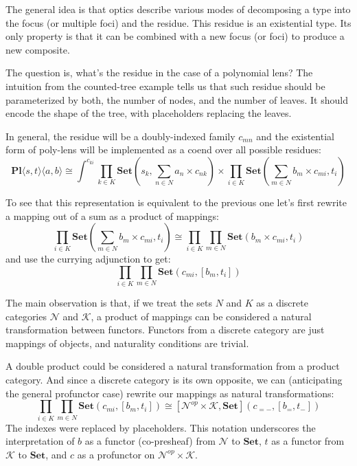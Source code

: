 \documentclass[11pt]{amsart}
\begin{document}
The general idea is that optics describe various modes of decomposing a type into the focus (or multiple foci) and the residue. This residue is an existential type. Its only property is that it can be combined with a new focus (or foci) to produce a new composite.

The question is, what's the residue in the case of a polynomial lens? The intuition from the counted-tree example tells us that such residue should be parameterized by both, the number of nodes, and the number of leaves. It should encode the shape of the tree, with placeholders replacing the leaves. 

In general, the residue will be a doubly-indexed family $c_{m n}$ and the existential form of poly-lens will be implemented as a coend over all possible residues:
\[ \mathbf{Pl}\langle s, t\rangle \langle a, b\rangle \cong \int^{c_{k i}} 
 \prod_{k \in K} \mathbf{Set} \left(s_k,  \sum_{n \in N} a_n \times c_{n k} \right) \times 
 \prod_{i \in K}  \mathbf{Set} \left(\sum_{m \in N} b_m \times c_{m i}, t_i \right) \]

To see that this representation is equivalent to the previous one let's first rewrite a mapping out of a sum as a product of mappings:
\[ \prod_{i \in K}  \mathbf{Set} \left(\sum_{m \in N} b_m \times c_{m i}, t_i \right) \cong 
\prod_{i \in K} \prod_{m \in N} \mathbf{Set}\left(b_m \times c_{m i}, t_i \right)\]
and use the currying adjunction to get:
\[ \prod_{i \in K} \prod_{m \in N} \mathbf{Set}\left(c_{m i}, [b_m, t_i ]\right)\]

The main observation is that, if we treat the sets $N$ and $K$ as a discrete categories $\mathcal{N}$ and $\mathcal{K}$, a product of mappings can be considered a natural transformation between functors. Functors from a discrete category are just mappings of objects, and naturality conditions are trivial. 


A double product could be considered a natural transformation from a product category. And since a discrete category is its own opposite, we can (anticipating the general profunctor case) rewrite our mappings as natural transformations:
\[ \prod_{i \in K} \prod_{m \in N} \mathbf{Set} \left(c_{m i}, [b_m, t_i] \right) \cong 
[\mathcal{N}^{op} \times \mathcal{K}, \mathbf{Set}]\left(c_{= -}, [b_=, t_- ]\right)\]
The indexes were replaced by placeholders. This notation underscores the interpretation of $b$ as a functor (co-presheaf) from $\mathcal{N}$ to $\mathbf{Set}$,  $t$ as a functor from $\mathcal{K}$ to $\mathbf{Set}$, and $c$ as a profunctor on $\mathcal{N}^{op} \times \mathcal{K}$.
\end{document}
